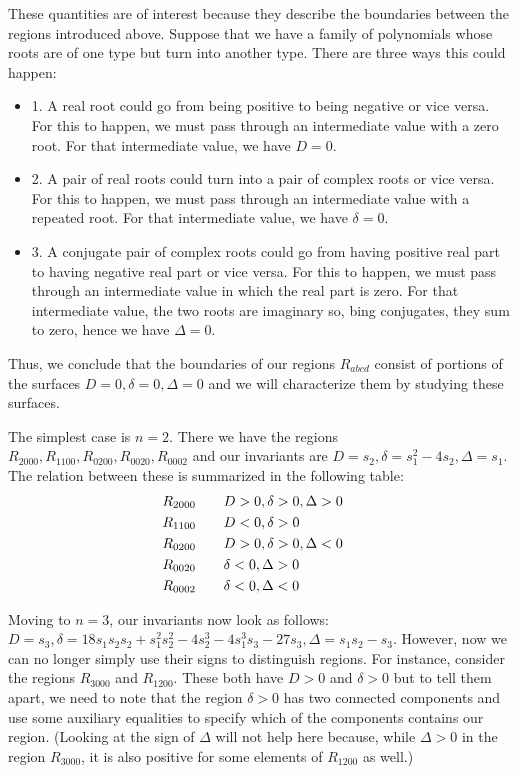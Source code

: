 \documentclass{amsart}
\theoremstyle{definition}
\theoremstyle{remark}
\numberwithin{equation}{section}
\begin{document}
These quantities are of interest because they describe the boundaries
between the regions introduced above.  Suppose that we have a family
of polynomials whose roots are of one type but turn into another type.
There are three ways this could happen:
\begin{itemize}
\item{1.} A real root could go from being positive to being negative
  or vice versa.  For this to happen, we must pass through an
  intermediate value with a zero root.  For that intermediate value,
  we have $D = 0$.
\item{2.} A pair of real roots could turn into a pair of complex roots
  or vice versa.  For this to happen, we must pass through an
  intermediate value with a repeated root.  For that intermediate
  value, we have $\delta = 0$.
\item{3.} A conjugate pair of complex roots could go from having
  positive real part to having negative real part or vice versa.  For
  this to happen, we must pass through an intermediate value in which
  the real part is zero.  For that intermediate value, the two roots
  are imaginary so, bing conjugates, they sum to zero, hence we have
  $\Delta = 0$.
\end{itemize}
\noindent  Thus, we conclude that the boundaries of our regions
$R_{abcd}$ consist of portions of the surfaces $D=0, \delta=0,
\Delta=0$ and we will characterize them by studying these surfaces.

The simplest case is $n=2$.  There we have the regions $R_{2000},
R_{1100}, R_{0200}, R_{0020}, R_{0002}$ and our invariants are $D =
s_2, \delta = s_1^2 - 4s_2, \Delta = s_1$.  The relation between these
is summarized in the following table:
\begin{align}
R_{2000} \qquad &D > 0, \delta > 0, \Delta > 0 \cr
R_{1100} \qquad &D < 0, \delta > 0 \cr
R_{0200} \qquad &D > 0, \delta > 0, \Delta < 0 \cr
R_{0020} \qquad &\delta < 0, \Delta > 0 \cr
R_{0002} \qquad &\delta < 0, \Delta < 0 \cr
\end{align}

Moving to $n=3$, our invariants now look as follows: $D = s_3, \delta
= 18 s_1 s_2 s_2 + s_1^2 s_2^2 - 4 s_2^3 - 4 s_1^3 s_3 - 27 s_3,
\Delta = s_1 s_2 - s_3$.  However, now we can no longer simply use their
signs to distinguish regions.  For instance, consider the regions
$R_{3000}$ and $R_{1200}$.  These both have $D > 0$ and $\delta > 0$
but to tell them apart, we need to note that the region $\delta > 0$
has two connected components and use some auxiliary equalities to
specify which of the components contains our region.  (Looking at the
sign of $\Delta$ will not help here because, while $\Delta > 0$ in the
region $R_{3000}$, it is also positive for some elements of $R_{1200}$
as well.)
\end{document}
